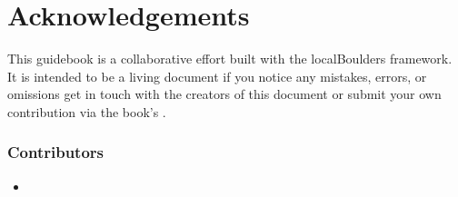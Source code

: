 \chapter{Acknowledgements}
\lhead{\textcolor{\chapterColor}{\rule[-2pt]{\textwidth}{15pt}}}
This guidebook is a collaborative effort built with the localBoulders framework. It is intended to be a living document if you notice any mistakes, errors, or omissions get in touch with the creators of this document or submit your own contribution via the book's .
\subsection*{Contributors}
\begin{itemize}
\item {}
\end{itemize}
\clearpage
